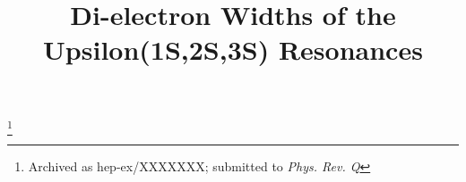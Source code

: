 \documentclass[aps,prd,preprint,superscriptaddress,tightenlines,nofootinbib,floatfix]{revtex4}
\begin{document}
\newcommand{\G}		{\mbox{${G}$}}
\newcommand{\GG}	{\mbox{${\cal G}$}}
\newcommand{\ARG}	{\mbox{${A}$}}
\newcommand{\LIN}	{\mbox{${L}$}}
\newcommand{\BW}	{\mbox{${\cal R}$}}
\newcommand{\FI}	{\mbox{${F_0}$}}
\newcommand{\DG}	{\mbox{${a\G_1+b\G_2}$}}
\newcommand{\GGG}	{\mbox{${a\G+b\GG}$}}
\newcommand{\DGG}	{\mbox{${a\GG_1+b\GG_2}$}}

\newcommand{\sba} 	{\mbox{${S/B}$}}
\newcommand{\rfw}   {\mbox{$R_2$}}
\newcommand{\effmc}     {\mbox{${\epsilon_{\rm MC}}$}}
\newcommand{\effdata}     {\mbox{${\epsilon_{\rm DATA}}$}}

\newcommand{\RR}	{\mbox{${\cal R}$}}

\newcommand{\subs}[1]{{\mbox{\scriptsize #1}}}
\newcommand{\re}{\mathrm{Re\:}}
\newcommand{\gee}{$\Gamma_{ee}$}
\newcommand{\ups}{$\Upsilon$}
\newcommand{\uone}{$\Upsilon(1S)$}
\newcommand{\utwo}{$\Upsilon(2S)$}
\newcommand{\uthree}{$\Upsilon(3S)$}
\newcommand{\mpprec}{$m_\subs{$\pi\pi$-rec}$}
\newcommand{\bbar}{$b\bar{b}$}
\newcommand{\inv}{$^{-1}$}
\newcommand{\twotoone}{$\Upsilon(2S) \to \pi^+\pi^- \Upsilon(1S)$}
\newcommand{\pip}{$\pi^+\pi^-$}
\newcommand{\tautau}{$\tau^+\tau^-$}
\newcommand{\dxy}{$d_{XY}$}
\newcommand{\dz}{$d_Z$}



\title{Di-electron Widths of the Upsilon(1S,2S,3S) Resonances}

\thanks{Archived as hep-ex/XXXXXXX; 
submitted to {\it Phys. Rev. Q}}

\end{document}
